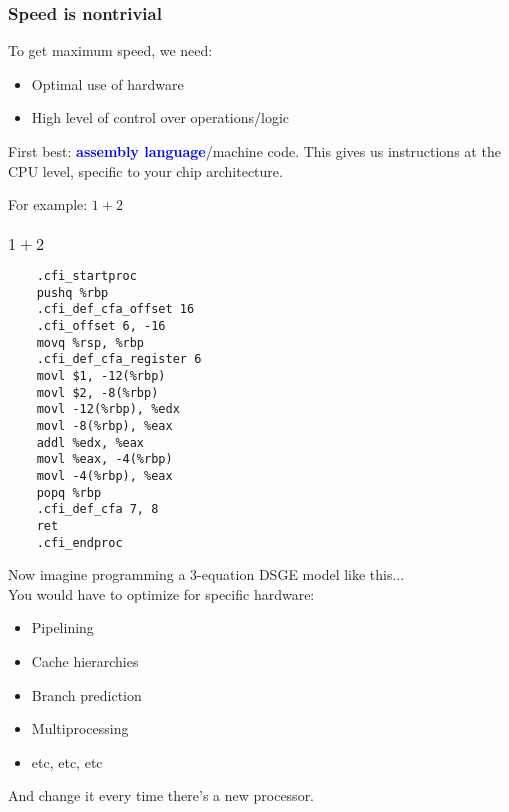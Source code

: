 \documentclass[
  xcolor={svgnames},
  hyperref={colorlinks,citecolor=DeepPink4,linkcolor=DarkRed,urlcolor=DarkBlue}
  ]{beamer}  %
\newcommand\boldblue[1]{\textcolor{blue}{\textbf{#1}}}
\begin{document}
\begin{frame}
  \frametitle{Speed is nontrivial}

  To get maximum speed, we need:
  \begin{itemize}
    \item Optimal use of hardware
    \item High level of control over operations/logic
  \end{itemize}

  \vspace{1em}
  First best: \boldblue{assembly language}/machine code. This gives us
  instructions at the CPU level, specific to your chip architecture.

  \vspace{1em}
  For example: $1 + 2$

\end{frame}

\begin{frame}[fragile]
  \frametitle{$1 + 2$}

  \lstset{style=julia}
  \begin{lstlisting}
    .cfi_startproc
    pushq %rbp
    .cfi_def_cfa_offset 16
    .cfi_offset 6, -16
    movq %rsp, %rbp
    .cfi_def_cfa_register 6
    movl $1, -12(%rbp)
    movl $2, -8(%rbp)
    movl -12(%rbp), %edx
    movl -8(%rbp), %eax
    addl %edx, %eax
    movl %eax, -4(%rbp)
    movl -4(%rbp), %eax
    popq %rbp
    .cfi_def_cfa 7, 8
    ret
    .cfi_endproc
  \end{lstlisting}

\end{frame}

\begin{frame}
  Now imagine programming a 3-equation DSGE model like this... \\

  \vspace{1em}
  You would have to optimize for specific hardware:
  \begin{itemize}
    \item Pipelining
    \item Cache hierarchies
    \item Branch prediction
    \item Multiprocessing
    \item etc, etc, etc
  \end{itemize}

  \vspace{1em}
  \pause
  And change it every time there's a new processor.

\end{frame}
\end{document}
